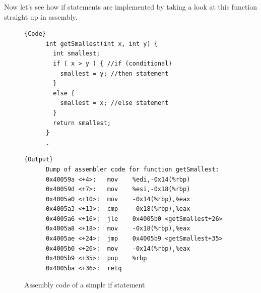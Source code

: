 \documentclass{article}
\begin{document}
  Now let's see how if statements are implemented by taking a look at this function straight up in assembly. 

  \begin{figure}[H]
    \centering 
    \noindent\begin{minipage}{.4\textwidth}
    \begin{lstlisting}[]{Code}
      int getSmallest(int x, int y) {
        int smallest;
        if ( x > y ) { //if (conditional)
          smallest = y; //then statement
        }
        else {
          smallest = x; //else statement
        }
        return smallest;
      }
      .
    \end{lstlisting}
    \end{minipage}
    \hfill
    \begin{minipage}{.59\textwidth}
    \begin{lstlisting}[]{Output}
      Dump of assembler code for function getSmallest:
      0x40059a <+4>:   mov    %edi,-0x14(%rbp)
      0x40059d <+7>:   mov    %esi,-0x18(%rbp)
      0x4005a0 <+10>:  mov    -0x14(%rbp),%eax
      0x4005a3 <+13>:  cmp    -0x18(%rbp),%eax
      0x4005a6 <+16>:  jle    0x4005b0 <getSmallest+26>
      0x4005a8 <+18>:  mov    -0x18(%rbp),%eax
      0x4005ae <+24>:  jmp    0x4005b9 <getSmallest+35>
      0x4005b0 <+26>:  mov    -0x14(%rbp),%eax
      0x4005b9 <+35>:  pop    %rbp
      0x4005ba <+36>:  retq
    \end{lstlisting}
    \end{minipage}
    \caption{Assembly code of a simple if statement} 
    \label{fig:if_statement}
  \end{figure}
\end{document}
